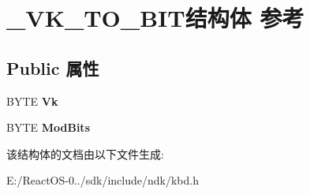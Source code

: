 \hypertarget{struct___v_k___t_o___b_i_t}{}\section{\+\_\+\+V\+K\+\_\+\+T\+O\+\_\+\+B\+I\+T结构体 参考}
\label{struct___v_k___t_o___b_i_t}
\subsection*{Public 属性}
\begin{DoxyCompactItemize}
\item 
\mbox{\label{struct___v_k___t_o___b_i_t_a88fbde00cfd3483e3d38ad5405b8946c}} 
B\+Y\+TE {\bfseries Vk}
\item 
\mbox{\label{struct___v_k___t_o___b_i_t_a6b6c7bde2e0bcc9ba5a517c2ca64ca46}} 
B\+Y\+TE {\bfseries Mod\+Bits}
\end{DoxyCompactItemize}


该结构体的文档由以下文件生成\+:\begin{DoxyCompactItemize}
\item 
E\+:/\+React\+O\+S-\/0../sdk/include/ndk/kbd.\+h\end{DoxyCompactItemize}
